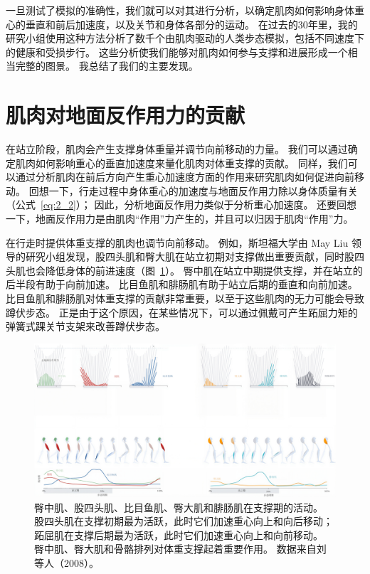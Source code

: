 一旦测试了模拟的准确性，我们就可以对其进行分析，以确定肌肉如何影响身体重心的垂直和前后加速度，以及关节和身体各部分的运动。
在过去的30年里，我的研究小组使用这种方法分析了数千个由肌肉驱动的人类步态模拟，包括不同速度下的健康和受损步行。
这些分析使我们能够对肌肉如何参与支撑和进展形成一个相当完整的图景。
我总结了我们的主要发现。


\section{肌肉对地面反作用力的贡献}

在站立阶段，肌肉会产生支撑身体重量并调节向前移动的力量。
我们可以通过确定肌肉如何影响重心的垂直加速度来量化肌肉对体重支撑的贡献。
同样，我们可以通过分析肌肉在前后方向产生重心加速度方面的作用来研究肌肉如何促进向前移动。
回想一下，行走过程中身体重心的加速度与地面反作用力除以身体质量有关（公式~\ref{eq:2_2}）；
因此，分析地面反作用力类似于分析重心加速度。
还要回想一下，地面反作用力是由肌肉“作用”力产生的，并且可以归因于肌肉“作用”力。


在行走时提供体重支撑的肌肉也调节向前移动。
例如，斯坦福大学由 May Liu 领导的研究小组发现，股四头肌和臀大肌在站立初期对支撑做出重要贡献，同时股四头肌也会降低身体的前进速度（图~\ref{fig:11_2}）。
臀中肌在站立中期提供支撑，并在站立的后半段有助于向前加速。
比目鱼肌和腓肠肌有助于站立后期的垂直和向前加速。
比目鱼肌和腓肠肌对体重支撑的贡献非常重要，以至于这些肌肉的无力可能会导致蹲伏步态。
正是由于这个原因，在某些情况下，可以通过佩戴可产生跖屈力矩的弹簧式踝关节支架来改善蹲伏步态。


\begin{figure}[!htb]
	\centering
	\includegraphics[width=1.0\linewidth]{chap11/11_2}
	\caption{臀中肌、股四头肌、比目鱼肌、臀大肌和腓肠肌在支撑期的活动。
		股四头肌在支撑初期最为活跃，此时它们加速重心向上和向后移动；
		跖屈肌在支撑后期最为活跃，此时它们加速重心向上和向前移动。
		臀中肌、臀大肌和骨骼排列对体重支撑起着重要作用。
		数据来自刘等人（2008）。 \label{fig:11_2}}
\end{figure}

